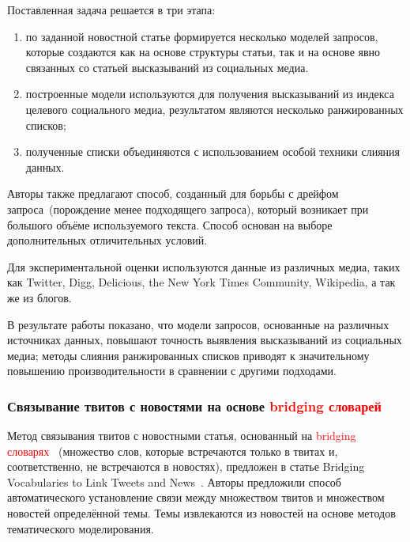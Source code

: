         Поставленная задача решается в три этапа:
        \begin{enumerate}
            \item по заданной новостной статье формируется несколько моделей запросов, которые создаются как на основе структуры статьи,
                так и на основе явно связанных со статьей высказываний из социальных медиа.
            \item построенные модели используются для получения высказываний из индекса целевого социального медиа, результатом являются несколько ранжированных списков;
            \item полученные списки объединяются с использованием особой техники слияния данных.
        \end{enumerate}

        Авторы также предлагают способ, созданный для борьбы с дрейфом запроса~(порождение менее подходящего запроса), который возникает при большого объёме используемого текста.
        Способ основан на выборе дополнительных отличительных условий.

        Для экспериментальной оценки используются данные из различных медиа, таких как Twitter, Digg, Delicious, the New York Times Community, Wikipedia, а так же из блогов.

        В результате работы показано, что модели запросов, основанные на различных источниках данных, повышают точность выявления высказываний из социальных медиа;
        методы слияния ранжированных списков приводят к значительному повышению производительности в сравнении с другими подходами.

    \subsubsection{Связывание твитов с новостями на основе \textcolor{red}{bridging словарей}}
        Метод связывания твитов с новостными статья, основанный на \textcolor{red}{bridging словарях}~
        (множество слов, которые встречаются только в твитах и, соответственно, не встречаются в новостях), предложен в статье Bridging Vocabularies to Link Tweets and News~\cite{bridging}.
        Авторы предложили способ автоматического установление связи между множеством твитов и множеством новостей определённой темы.
        Темы извлекаются из новостей на основе методов тематического моделирования.

